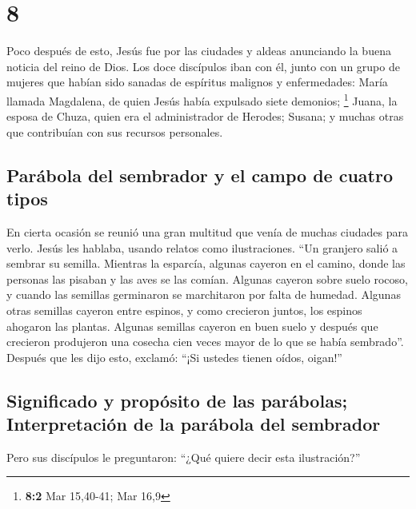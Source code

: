 \hypertarget{section-7}{%
\section{8}\label{section-7}}

 Poco después de esto, Jesús fue por las ciudades y aldeas
anunciando la buena noticia del reino de Dios. Los doce discípulos iban
con él,  junto con un grupo de mujeres que habían sido
sanadas de espíritus malignos y enfermedades: María llamada Magdalena,
de quien Jesús había expulsado siete demonios; \footnote{\textbf{8:2}
  Mar 15,40-41; Mar 16,9}  Juana, la esposa de Chuza,
quien era el administrador de Herodes; Susana; y muchas otras que
contribuían con sus recursos personales.

\hypertarget{paruxe1bola-del-sembrador-y-el-campo-de-cuatro-tipos}{%
\subsection{Parábola del sembrador y el campo de cuatro
tipos}\label{paruxe1bola-del-sembrador-y-el-campo-de-cuatro-tipos}}

 En cierta ocasión se reunió una gran multitud que venía
de muchas ciudades para verlo. Jesús les hablaba, usando relatos como
ilustraciones.  ``Un granjero salió a sembrar su semilla.
Mientras la esparcía, algunas cayeron en el camino, donde las personas
las pisaban y las aves se las comían.  Algunas cayeron
sobre suelo rocoso, y cuando las semillas germinaron se marchitaron por
falta de humedad.  Algunas otras semillas cayeron entre
espinos, y como crecieron juntos, los espinos ahogaron las plantas.
 Algunas semillas cayeron en buen suelo y después que
crecieron produjeron una cosecha cien veces mayor de lo que se había
sembrado''. Después que les dijo esto, exclamó: ``¡Si ustedes tienen
oídos, oigan!''

\hypertarget{significado-y-propuxf3sito-de-las-paruxe1bolas-interpretaciuxf3n-de-la-paruxe1bola-del-sembrador}{%
\subsection{Significado y propósito de las parábolas; Interpretación de
la parábola del
sembrador}\label{significado-y-propuxf3sito-de-las-paruxe1bolas-interpretaciuxf3n-de-la-paruxe1bola-del-sembrador}}

 Pero sus discípulos le preguntaron: ``¿Qué quiere decir
esta ilustración?''

